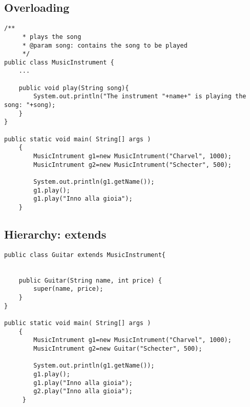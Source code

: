 \documentclass{article}
\begin{document}
\subsection{Overloading}

\begin{lstlisting}
/**
	 * plays the song
	 * @param song: contains the song to be played
	 */
public class MusicInstrument {
	...

	public void play(String song){
		System.out.println("The instrument "+name+" is playing the song: "+song);
	}
}

public static void main( String[] args )
    {
    	MusicIntrument g1=new MusicIntrument("Charvel", 1000);
    	MusicIntrument g2=new MusicIntrument("Schecter", 500);
    	
    	System.out.println(g1.getName());
    	g1.play();
    	g1.play("Inno alla gioia");
    }
\end{lstlisting}

\subsection{Hierarchy: extends}

\begin{lstlisting}
public class Guitar extends MusicInstrument{
	
	
	public Guitar(String name, int price) {
		super(name, price);
	}
}

public static void main( String[] args )
    {
    	MusicIntrument g1=new MusicIntrument("Charvel", 1000);
    	MusicIntrument g2=new Guitar("Schecter", 500);
    	
    	System.out.println(g1.getName());
    	g1.play();
    	g1.play("Inno alla gioia");
    	g2.play("Inno alla gioia");
     }
\end{lstlisting}
\end{document}
